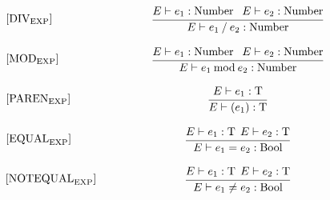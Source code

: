 \begin{equation}
\begin{minipage}{.2\linewidth}
$[\text{DIV}_\text{EXP}]$
\end{minipage}
\begin{minipage}{.8\linewidth}
\centering
$\cfrac{E \vdash e_1 : \text{Number }\: \: E \vdash e_2 : \text{Number}}{E \vdash e_1 \: / \: e_2 : \text{Number}}$
\end{minipage}
\end{equation}

\begin{equation}
\begin{minipage}{.2\linewidth}
$[\text{MOD}_\text{EXP}]$
\end{minipage}
\begin{minipage}{.8\linewidth}
\centering
$\cfrac{E \vdash e_1 : \text{Number }\: \: E \vdash e_2 : \text{Number}}{E \vdash e_1 \: \text{mod} \: e_2 : \text{Number}}$
\end{minipage}
\end{equation}

\begin{equation}
\begin{minipage}{.2\linewidth}
$[\text{PAREN}_\text{EXP}]$
\end{minipage}
\begin{minipage}{.8\linewidth}
\centering
$\cfrac{E \vdash e_1 : \text{T}}{E \vdash (e_1) : \text{T}}$
\end{minipage}
\end{equation}

\begin{equation}
\begin{minipage}{.2\linewidth}
$[\text{EQUAL}_\text{EXP}]$
\end{minipage}
\begin{minipage}{.8\linewidth}
\centering
$\cfrac{E \vdash e_1 : \text{T} \: \: E \vdash e_2 : \text{T}}{E \vdash e_1 = e_2 : \text{Bool}}$
\end{minipage}
\end{equation}


\begin{equation}
\begin{minipage}{.2\linewidth}
$[\text{NOTEQUAL}_\text{EXP}]$
\end{minipage}
\begin{minipage}{.8\linewidth}
\centering
$\cfrac{E \vdash e_1 : \text{T} \: \: E \vdash e_2 : \text{T}}{E \vdash e_1 \neq e_2 : \text{Bool}}$
\end{minipage}
\end{equation}

